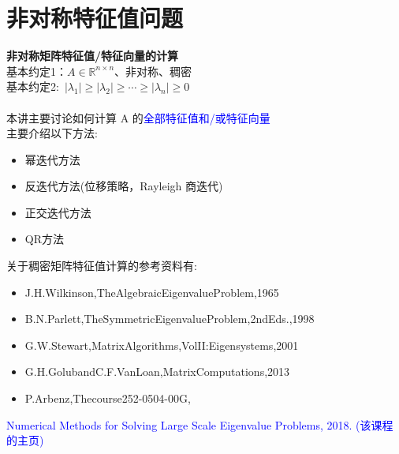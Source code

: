 \documentclass[12pt,a4paper]{article}
\begin{document}
\section{非对称特征值问题}
	\noindent \textbf{非对称矩阵特征值/特征向量的计算}\\
	基本约定1：$A \in \mathbb{R}^{n \times n}$、非对称、稠密\\
	基本约定2:~$\left|\lambda_{1}\right| \geq\left|\lambda_{2}\right| \geq \cdots \geq\left|\lambda_{n}\right| \geq 0$\\
	\\
	本讲主要讨论如何计算 A 的\textcolor{blue}{全部特征值和/或特征向量}\\
	主要介绍以下方法:\\
	\begin{itemize}
		\item 幂迭代方法
		\item  反迭代方法(位移策略，Rayleigh 商迭代) \item 正交迭代方法
		\item QR方法
	\end{itemize}
	关于稠密矩阵特征值计算的参考资料有:\\
	\begin{itemize}
		\item J.H.Wilkinson,TheAlgebraicEigenvalueProblem,1965
		\item B.N.Parlett,TheSymmetricEigenvalueProblem,2ndEds.,1998
		\item G.W.Stewart,MatrixAlgorithms,VolII:Eigensystems,2001
		\item G.H.GolubandC.F.VanLoan,MatrixComputations,2013
		\item P.Arbenz,Thecourse252-0504-00G,
	\end{itemize}
	\textcolor{blue}{Numerical Methods for Solving Large Scale Eigenvalue Problems, 2018.
		(该课程的主页)}
\end{document}

